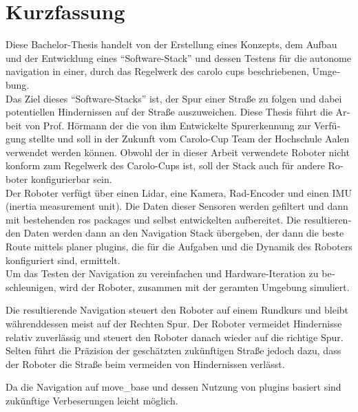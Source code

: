 \chapter*{Kurzfassung}
\label{kurzfassung}

\begin{otherlanguage}{ngerman}

Diese Bachelor-Thesis handelt von der Erstellung eines Konzepts, dem Aufbau und der Entwicklung eines ``Software-Stack'' und dessen Testens für die autonome navigation in einer, durch das Regelwerk des carolo cups beschriebenen, Umgebung.\\

Das Ziel dieses ``Software-Stacks'' ist, der Spur einer Straße zu folgen und dabei potentiellen Hindernissen auf der Straße auszuweichen. Diese Thesis führt die Arbeit von Prof. Hörmann der die von ihm Entwickelte Spurerkennung zur Verfügung stellte und soll in der Zukunft vom Carolo-Cup Team der Hochschule Aalen verwendet werden können. Obwohl der in dieser Arbeit verwendete Roboter nicht konform zum Regelwerk des Carolo-Cups ist, soll der Stack auch für andere Roboter konfigurierbar sein.\\

Der Roboter verfügt über einen Lidar, eine Kamera, Rad-Encoder und einen IMU (inertia measurement unit). Die Daten dieser Sensoren werden gefiltert und dann mit bestehenden ros packages und selbst entwickelten aufbereitet. Die resultierenden Daten werden dann an den Navigation Stack  übergeben, der dann die beste Route mittels planer plugins, die für die Aufgaben und die Dynamik des Roboters konfiguriert sind, ermittelt.\\

Um das Testen der Navigation zu vereinfachen und Hardware-Iteration zu beschleunigen, wird der Roboter, zusammen mit der geramten Umgebung simuliert.

Die resultierende Navigation steuert den Roboter auf einem Rundkurs und bleibt währenddessen meist auf der Rechten Spur. Der Roboter vermeidet Hindernisse relativ zuverlässig und steuert den Roboter danach wieder auf die richtige Spur. Selten führt die Präzision der geschätzten zukünftigen Straße jedoch dazu, dass der Roboter die Straße beim vermeiden von Hindernissen verlässt.

Da die Navigation auf move\_base und dessen Nutzung von plugins basiert sind zukünftige Verbeserungen leicht möglich.

\end{otherlanguage}
